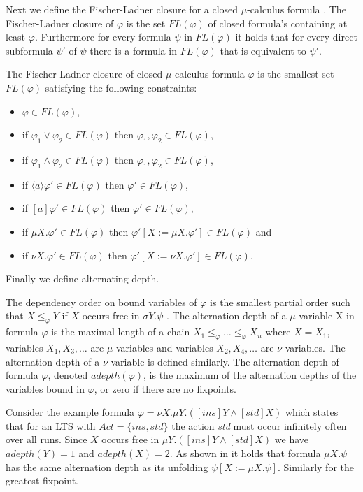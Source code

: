 Next we define the Fischer-Ladner closure for a closed $\mu$-calculus formula 
\cite{STREETT1989249,FISCHER1979194}. The Fischer-Ladner closure of $\varphi$ is the set $\textit{FL}(\varphi)$ of closed formula's containing at least $\varphi$. Furthermore for every formula $\psi$ in $\textit{FL}(\varphi)$ it holds that for every direct subformula $\psi'$ of $\psi$ there is a formula in $\textit{FL}(\varphi)$ that is equivalent to $\psi'$.
\begin{definition}
	\label{def_FLClosure}
	The Fischer-Ladner closure of closed $\mu$-calculus formula $\varphi$ is the smallest set $\textit{FL}(\varphi)$ satisfying the following constraints:
	\begin{itemize}
		\item $\varphi \in \textit{FL}(\varphi)$,
		\item if $\varphi_1 \vee \varphi_2 \in \textit{FL}(\varphi)$ then $\varphi_1 ,\varphi_2 \in \textit{FL}(\varphi)$,
		\item if $\varphi_1 \wedge \varphi_2 \in \textit{FL}(\varphi)$ then $\varphi_1 ,\varphi_2 \in \textit{FL}(\varphi)$,
		\item if $\langle a \rangle \varphi' \in \textit{FL}(\varphi)$ then $\varphi' \in \textit{FL}(\varphi)$,
		\item if $[ a ] \varphi' \in \textit{FL}(\varphi)$ then $\varphi' \in \textit{FL}(\varphi)$,
		\item if $\mu X . \varphi' \in \textit{FL}(\varphi)$ then $\varphi'[X:= \mu X . \varphi'] \in \textit{FL}(\varphi)$ and
		\item if $\nu X . \varphi' \in \textit{FL}(\varphi)$ then $\varphi'[X:= \nu X . \varphi'] \in \textit{FL}(\varphi)$.
		
	\end{itemize}
\end{definition}

Finally we define alternating depth.
\begin{definition}\cite{Bradfield2018}
	The dependency order on bound variables of $\varphi$	is the smallest partial order such that $X \leq_\varphi Y$ if $X$ occurs free in $\sigma Y. \psi$ . The alternation depth of a $\mu$-variable X in formula $\varphi $ is the maximal length of a chain $X_1 \leq_\varphi  \dots \leq_\varphi X_n$ where $X = X_1$, variables $X_1, X_3, \dots$ are $\mu$-variables and variables $X_2, X_4, \dots$ are $\nu$-variables. The alternation depth of a $\nu$-variable is defined similarly. The alternation depth of formula $\varphi$, denoted $adepth(\varphi)$, is the maximum of the alternation depths of the variables bound in $\varphi$, or zero if there are no fixpoints.
\end{definition}
Consider the example formula $\varphi = \nu X. \mu Y. ([ins]Y \wedge [std] X)$ which states that for an LTS with $Act = \{ ins, std\}$ the action \textit{std} must occur infinitely often over all runs. Since $X$ occurs free in $\mu Y. ([ins] Y \wedge [std]X)$ we have $adepth(Y) = 1$ and $adepth(X) = 2$. As shown in \cite{Bradfield2018} it holds that formula $\mu X. \psi$ has the same alternation depth as its unfolding $\psi[X:=\mu X. \psi]$. Similarly for the greatest fixpoint.



